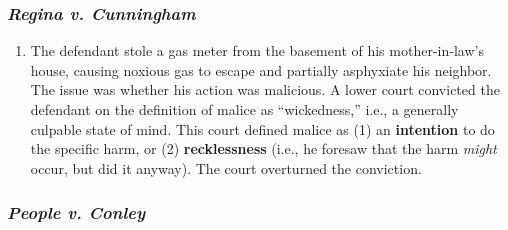 \subsubsection{\emph{Regina v. Cunningham}}

\begin{enumerate}
    \item The defendant stole a gas meter from the basement of his mother-in-law's house, causing noxious gas to escape and partially asphyxiate his neighbor. The issue was whether his action was malicious. A lower court convicted the defendant on the definition of malice as ``wickedness,'' i.e., a generally culpable state of mind. This court defined malice as (1) an \textbf{intention} to do the specific harm, or (2) \textbf{recklessness} (i.e., he foresaw that the harm \emph{might} occur, but did it anyway). The court overturned the conviction.
\end{enumerate}

\subsubsection{\emph{People v. Conley}}

